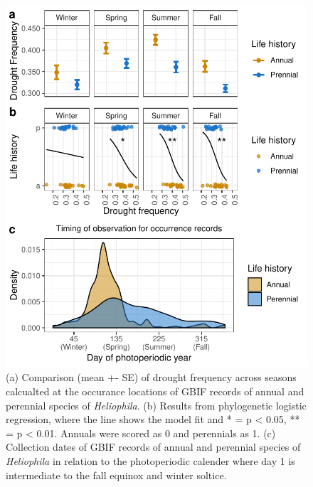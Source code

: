 \documentclass[man,floatsintext]{apa6}
\theoremstyle{definition}
\theoremstyle{definition}
\theoremstyle{definition}
\theoremstyle{remark}
\begin{document}
\begin{figure}[!h]
\includegraphics[width=\textwidth]{../figures/line_and_dates} \caption{(a) Comparison (mean +- SE) of drought frequency across
seasons calcualted at the occurance locations of GBIF records of annual
and perennial species of \emph{Heliophila}. (b) Results from
phylogenetic logistic regression, where the line shows the model fit and
* = p \textless{} 0.05, ** = p \textless{} 0.01. Annuals were scored as
0 and perennials as 1. (c) Collection dates of GBIF records of annual
and perennial species of \emph{Heliophila} in relation to the
photoperiodic calender where day 1 is intermediate to the fall equinox
and winter soltice.}\label{fig:lineplots}
\end{figure}
\end{document}
